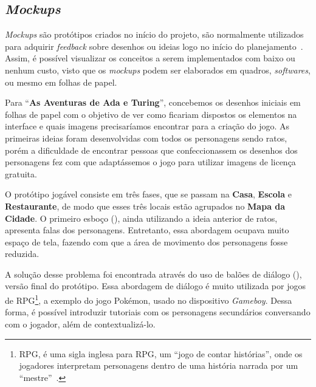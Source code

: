 \subsection{\textit{Mockups}} \label{ssec:mockups}

\textit{Mockups} são protótipos criados no início do projeto, são normalmente utilizados para adquirir \textit{feedback} sobre desenhos ou ideias logo no início do planejamento~\cite{interaction_design_foundation_mock-ups_nodate}. Assim, é possível visualizar os conceitos a serem implementados com baixo ou nenhum custo, visto que os \textit{mockups} podem ser elaborados em quadros, \textit{softwares}, ou mesmo em folhas de papel.

Para “\textbf{As Aventuras de Ada e Turing}”, concebemos os desenhos iniciais em folhas de papel com o objetivo de ver como ficariam dispostos os elementos na interface e quais imagens precisaríamos encontrar para a criação do jogo. As primeiras ideias foram desenvolvidas com todos os personagens sendo ratos, porém a dificuldade de encontrar pessoas que confeccionassem os desenhos dos personagens fez com que adaptássemos o jogo para utilizar imagens de licença gratuita.

O protótipo jogável consiste em três fases, que se passam na \textbf{Casa}, \textbf{Escola} e \textbf{Restaurante}, de modo que esses três locais estão agrupados no \textbf{Mapa da Cidade}. O primeiro esboço (), ainda utilizando a ideia anterior de ratos, apresenta falas dos personagens. Entretanto, essa abordagem ocupava muito espaço de tela, fazendo com que a área de movimento dos personagens fosse reduzida. 


A solução desse problema foi encontrada através do uso de balões de diálogo (), versão final do protótipo. Essa abordagem de diálogo é muito utilizada por jogos de \acrshort{RPG}\footnote{\acrshort{RPG}, é uma sigla inglesa para \acrlong{RPG}, um “jogo de contar histórias”, onde os jogadores interpretam personagens dentro de uma história narrada por um “mestre”~\cite{cabalero_o_2007}.}, a exemplo do jogo Pokémon, usado no dispositivo \textit{Gameboy}. Dessa forma, é possível introduzir tutoriais com os personagens secundários conversando com o jogador, além de contextualizá-lo.


